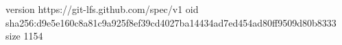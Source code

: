 version https://git-lfs.github.com/spec/v1
oid sha256:d9e5e160c8a81c9a925f8ef39cd4027ba14434ad7ed454ad80ff9509d80b8333
size 1154

